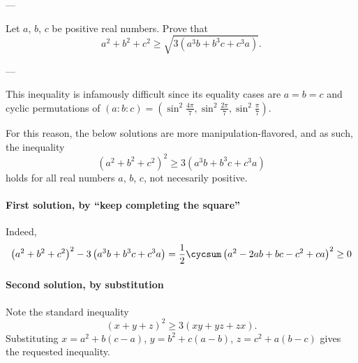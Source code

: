 
---

Let $a$, $b$, $c$ be positive real numbers. Prove that \[a^2+b^2+c^2\ge\sqrt{3\left(a^3b+b^3c+c^3a\right)}.\]

---

This inequality is infamously difficult since its equality cases are $a=b=c$ and cyclic permutations of $(a:b:c)=\left(\sin^2\frac{4\pi}7,\sin^2\frac{2\pi}7,\sin^2\frac\pi7\right)$.
\begin{remark}
    For this reason, the below solutions are more manipulation-flavored, and as such, the inequality \[\left(a^2+b^2+c^2\right)^2\ge3\left(a^3b+b^3c+c^3a\right)\]
    holds for all real numbers $a$, $b$, $c$, not necesarily positive.
\end{remark}
\paragraph{First solution, by ``keep completing the square''} Indeed,
\[
    \left(a^2+b^2+c^2\right)^2-3\left(a^3b+b^3c+c^3a\right)
    =\frac12\cycsum\left(a^2-2ab+bc-c^2+ca\right)^2\ge0
\]

\paragraph{Second solution, by substitution} Note the standard inequality \[(x+y+z)^2\ge3(xy+yz+zx).\]
Substituting $x=a^2+b(c-a)$, $y=b^2+c(a-b)$, $z=c^2+a(b-c)$ gives the requested inequality.


